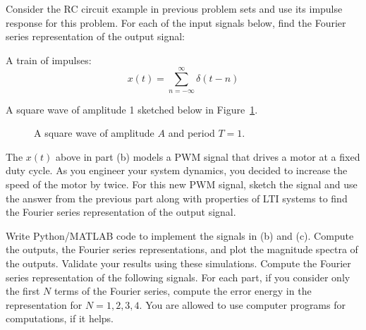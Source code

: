 \documentclass{ee102_pset}
\author{\rule{3cm}{0.4pt}} %
\begin{document}
Consider the RC circuit example in previous problem sets and use its impulse response for this problem. For each of the input signals below, find the Fourier series representation of the output signal:

\problempart[20 points] A train of impulses:
\[
x(t) = \sum_{n=-\infty}^{\infty} \delta(t - n)
\]

\problempart[20 points] A square wave of amplitude 1 sketched below in Figure~\ref{fig:square_wave}. 
\begin{figure}[h]
  \centering
\caption{A square wave of amplitude $A$ and period $T=1$.}
\label{fig:square_wave}

\end{figure}
\problempart[20 points] The $x(t)$ above in part (b) models a PWM signal that drives a motor at a fixed duty cycle. As you engineer your system dynamics, you decided to increase the speed of the motor by twice. For this new PWM signal, sketch the signal and use the answer from the previous part along with properties of LTI systems to find the Fourier series representation of the output signal.

\problempart[10 points] Write Python/MATLAB code to implement the signals in (b) and (c). Compute the outputs, the Fourier series representations, and plot the magnitude spectra of the outputs. Validate your results using these simulations. 
Compute the Fourier series representation of the following signals. For each part, if you consider only the first $N$ terms of the Fourier series, compute the error energy in the representation for $N=1,2,3,4$. You are allowed to use computer programs for computations, if it helps.
\end{document}
